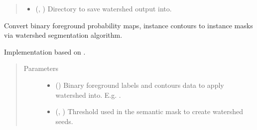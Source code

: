 \documentclass[letterpaper,10pt,english]{sphinxmanual}
\begin{document}
\begin{fulllineitems}
\begin{quote}
\begin{description}
\begin{itemize}
\item {} 
 (, ) \textendash{} Directory to save watershed output into.

\end{itemize}

\end{description}\end{quote}

\end{fulllineitems}


\begin{fulllineitems}
\label{\detokenize{data/post_processing/post_processing:data.post_processing.post_processing.bcd_watershed}}
Convert binary foreground probability maps, instance contours to instance masks via watershed segmentation
algorithm.

Implementation based on .
\begin{quote}\begin{description}
\item[{Parameters}] \leavevmode\begin{itemize}
\item {} 
 () \textendash{} Binary foreground labels and contours data to apply watershed into. E.g. .

\item {} 
 (, ) \textendash{} Threshold used in the semantic mask to create watershed seeds.


\end{itemize}
\end{description}
\end{quote}
\end{fulllineitems}
\end{document}
